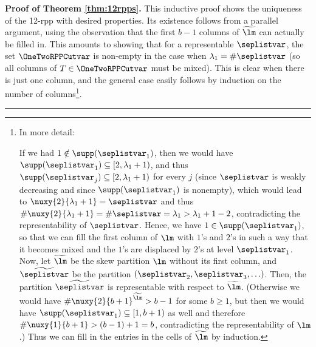 \documentclass[numbers=enddot,12pt,final,onecolumn,notitlepage]{scrartcl}%
\theoremstyle{definition}
\newenvironment{proof}[1][Proof]{\noindent\textbf{#1.} }{\ \rule{0.5em}{0.5em}}
\begin{document}
\begin{proof}[Proof of Theorem \ref{thm:12rpps}]
This inductive proof shows the uniqueness of the 12-rpp with desired properties. Its existence follows from a parallel argument, using the observation that the first $b-1$ columns of $\widetilde{\lm}$ can actually be filled in. This amounts to showing that for a representable $\seplistvar$, the set $\OneTwoRPPCutvar$ is non-empty in the case when $\lambda_1 = \#\seplistvar$ (so all columns of $T \in \OneTwoRPPCutvar$ must be mixed). This is clear when there is just one column, and the general case easily follows by induction on the number of columns\footnote{In more detail: \par
If we had $1 \notin \supp(\seplistvar_1)$, then we would have $\supp(\seplistvar_1) \subseteq [2, \lambda_1+1)$, and thus $\supp(\seplistvar_j) \subseteq [2, \lambda_1+1)$ for every $j$ (since $\seplistvar$ is weakly decreasing and since $\supp(\seplistvar_1)$ is nonempty), which would lead to $\nuxy{2}{\lambda_1+1} = \seplistvar$ and thus $\#\nuxy{2}{\lambda_1+1} = \#\seplistvar = \lambda_1 > \lambda_1 + 1 - 2$, contradicting the representability of $\seplistvar$. Hence, we have $1 \in \supp(\seplistvar_1)$, so that we can fill the first column of $\lm$ with $1$'s and $2$'s in such a way that it becomes mixed and the $1$'s are displaced by $2$'s at level $\seplistvar_1$. Now, let $\widetilde{\lm}$ be the skew partition $\lm$ without its first column, and $\widetilde{\seplistvar}$ be the partition $\left(\seplistvar_2, \seplistvar_3, \ldots\right)$. Then, the partition $\widetilde{\seplistvar}$ is representable with respect to $\widetilde{\lm}$. (Otherwise we would have $\#\nuxy{2}{b+1}^{\widetilde{\lm}}>b-1$ for some $b \geq 1$, but then we would have $\supp(\seplistvar_1) \subseteq [1,b+1)$ as well and therefore $\#\nuxy{1}{b+1}>(b-1)+1=b$, contradicting the representability of $\lm$.) Thus we can fill in the entries in the cells of $\widetilde{\lm}$ by induction.}.
\end{proof}
\end{document}
